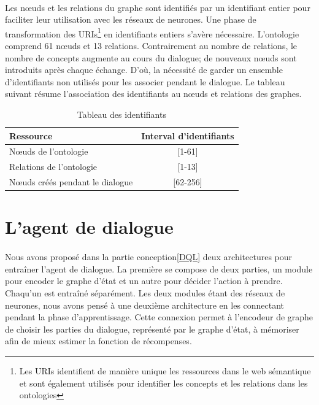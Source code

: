 \paragraph{}Les n\oe{}uds et les relations du graphe sont identifiés par un identifiant entier pour faciliter leur utilisation avec les réseaux de neurones. Une phase de transformation des URIs\footnote{Les URIs identifient de manière unique les ressources dans le web sémantique et sont également utilisés pour identifier les concepts et les relations dans les ontologies} en identifiants entiers s'avère nécessaire. L'ontologie comprend 61 n\oe{}uds et 13 relations. Contrairement au nombre de relations, le nombre de concepts augmente au cours du dialogue; de nouveaux n\oe{}uds sont introduits après chaque échange. D'où, la nécessité de garder un ensemble d'identifiants non utilisés pour les associer pendant le dialogue. Le tableau suivant résume l'association des identifiants au n\oe{}uds et relations des graphes.
\begin{table}[H]
	\begin{center}
		
		\begin{tabular}{|l|c|}
			\hline
			\textbf{Ressource} & \textbf{Interval d'identifiants}\\
			\hline
			N\oe{}uds de l'ontologie & [1-61]\\
			\hline
			Relations de l'ontologie & [1-13]\\
			\hline
			N\oe{}uds créés pendant le dialogue & [62-256]\\
			\hline
		\end{tabular}
		\caption{Tableau des identifiants}\label{table_ids}
	\end{center}
\end{table}
\section{L'agent de dialogue}\label{DMReal}
\paragraph{}Nous avons proposé dans la partie conception\ref{DQL} deux architectures pour entraîner l'agent de dialogue. La première se compose de deux parties, un module pour encoder le graphe d'état et un autre pour décider l'action à prendre. Chaqu'un est entraîné séparément. Les deux modules étant des réseaux de neurones, nous avons pensé à une deuxième architecture en les connectant pendant la phase d'apprentissage. Cette connexion permet à l'encodeur de graphe de choisir les parties du dialogue, représenté par le graphe d'état, à mémoriser afin de mieux estimer la fonction de récompenses.
